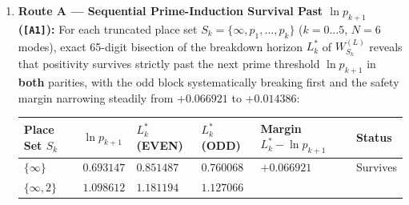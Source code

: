 \documentclass[
  11pt,
]{article}
\newcounter{none} %
\begin{document}
\begin{enumerate}
\def\labelenumi{\arabic{enumi}.}
\item
  \textbf{Route A --- Sequential Prime-Induction Survival Past
  \(\ln p_{k+1}\) (\texttt{{[}A1{]}}):} For each truncated place set
  \(S_k = \{\infty, p_1, \dots, p_k\}\) (\(k = 0 \dots 5\), \(N = 6\)
  modes), exact 65-digit bisection of the breakdown horizon \(L_k^*\) of
  \(W_{S_k}^{(L)}\) reveals that positivity survives strictly past the
  next prime threshold \(\ln p_{k+1}\) in \textbf{both} parities, with
  the odd block systematically breaking first and the safety margin
  narrowing steadily from \(+0.066921\) to \(+0.014386\):

  {\def\LTcaptype{none} %
  \begin{longtable}[]{@{}
    >{\raggedright\arraybackslash}p{}
    >{\centering\arraybackslash}p{}
    >{\centering\arraybackslash}p{}
    >{\centering\arraybackslash}p{}
    >{\centering\arraybackslash}p{}
    >{\raggedright\arraybackslash}p{}@{}}
  \toprule\noalign{}
  \begin{minipage}[b]{\linewidth}\raggedright
  Place Set \(S_k\)
  \end{minipage} & \begin{minipage}[b]{\linewidth}\centering
  \(\ln p_{k+1}\)
  \end{minipage} & \begin{minipage}[b]{\linewidth}\centering
  \(L_k^*\) (EVEN)
  \end{minipage} & \begin{minipage}[b]{\linewidth}\centering
  \(L_k^*\) (ODD)
  \end{minipage} & \begin{minipage}[b]{\linewidth}\centering
  Margin \(L_k^* - \ln p_{k+1}\)
  \end{minipage} & \begin{minipage}[b]{\linewidth}\raggedright
  Status
  \end{minipage} \\
  \midrule\noalign{}
  \endhead
  \bottomrule\noalign{}
  \endlastfoot
  \(\{\infty\}\) & \(0.693147\) & \(0.851487\) & \(0.760068\) &
  \(+0.066921\) & Survives \\
  \(\{\infty, 2\}\) & \(1.098612\) & \(1.181194\) & \(1.127066\) &

\end{longtable}}
\end{enumerate}
\end{document}
